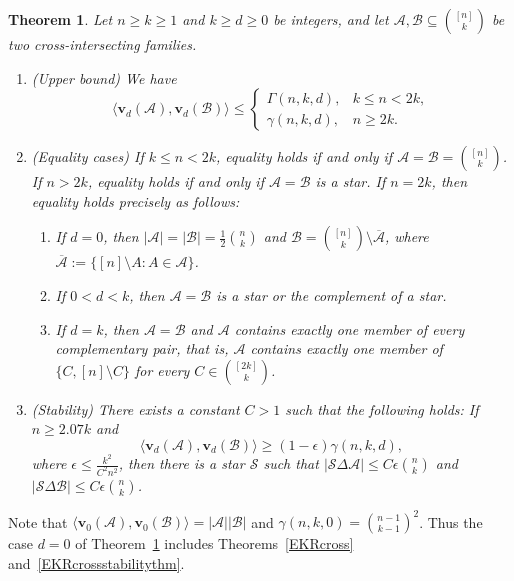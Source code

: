 \documentclass[11pt]{article}
\numberwithin{equation}{section}
\newtheorem{theorem}{Theorem}[section]
\def\A{\mathcal{A}}
\def\B{\mathcal{B}}
\def\F{\mathcal{F}}
\def\v{\mathbf{v}}
\begin{document}
\begin{theorem}\label{EKR2normmainthm}
Let $n \geq k\geq1$ and $k\geq d \geq 0$ be integers, and let
$\A,\B\subseteq \binom{[n]}{k}$ be two cross-intersecting families.
\begin{enumerate}[label={\rm (\alph*)}]
\item {\rm(Upper bound)} We have
\[
\big\langle\mathbf{v}_{d}(\A),\mathbf{v}_{d}(\B)\big\rangle
\leq
\begin{cases}
\Gamma(n,k,d),& k\leq n<2k,\\
\gamma(n,k,d),& n\geq 2k.
\end{cases}
\]

\item {\rm(Equality cases)}
If $k\leq n<2k$, equality holds if and only if
$\A=\B=\binom{[n]}k$.
If $n>2k$, equality holds if and only if $\A=\B$ is a star.
If $n=2k$, %
then equality holds precisely as follows:
\begin{enumerate}[label={\rm (\roman*)}]
\item If $d=0$, then $|\A|= |\B|=\frac{1}{2}\binom {n}{k}$ and
    $\mathcal B=\binom{[n]}k\setminus\overline{\mathcal A}$, where $\overline{\A}:=\{[n]\setminus A:A\in\A\}$.






\item If $0<d<k$, then  $\A=\B$ is a star or the complement of a star.

\item If $d=k$, then  $\A=\B$ and $\A$ contains exactly one
member of every complementary pair, that is, $\A$ contains exactly one member of $\{C,[n]\setminus C\}$ for every $C\in \binom{[2k]}{k}$.
\end{enumerate}

\item {\rm(Stability)} There exists a constant $C>1$ such that the following holds: If $n\geq 2.07k$ and
\[
\big\langle\v_d(\A),\v_d(\B)\big\rangle
\geq (1-\epsilon)\gamma(n,k,d),
\]
where $\epsilon\leq \frac{k^2}{C^2 n ^2 }$, then there is a star
$\mathcal{S}$ such that
$|\mathcal{S} \Delta \A|\leq C \epsilon \binom{n}{k}$ and
$|\mathcal{S} \Delta \B|\leq C \epsilon \binom{n}{k}$.
\end{enumerate}
\end{theorem}

Note that $\langle\mathbf{v}_0(\A),\mathbf{v}_0(\B)\rangle=|\A||\B|$ and
$\gamma(n,k,0)=\binom{n-1}{k-1}^2$.
Thus the case $d=0$ of Theorem~\ref{EKR2normmainthm} includes Theorems~\ref{EKRcross} and~\ref{EKRcrossstabilitythm}.
\end{document}
